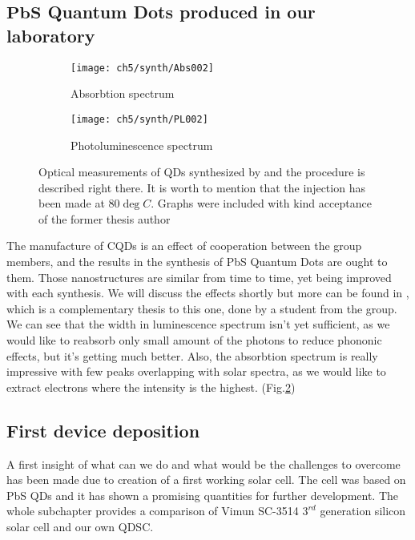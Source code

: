 \subsection{$\mathbf{PbS}$ Quantum Dots produced in our laboratory}

\begin{figure}
\centering
\begin{subfigure}[b]{0.7\textwidth}
\centering
\texttt{[image: ch5/synth/Abs002]}
\caption{Absorbtion spectrum}
\end{subfigure}

\hfill

\begin{subfigure}[b]{0.7\textwidth}
\centering
\texttt{[image: ch5/synth/PL002]}
\caption{Photoluminescence spectrum}
\label{fig:synth}
\end{subfigure}

\caption{Optical measurements of QDs synthesized by \cite{swietek} and the procedure is described right there. It is worth to mention that the injection has been made at 80$\deg C$. Graphs were included with kind acceptance of the former thesis author}
\end{figure}

The manufacture of CQDs is an effect of cooperation between the group members, and the results in the synthesis of PbS Quantum Dots are ought to them. Those nanostructures are similar from time to time, yet being improved with each synthesis. We will discuss the effects shortly but more can be found in \cite{swietek}, which is a complementary thesis to this one, done by a student from the group. We can see that the width in luminescence spectrum isn't yet sufficient, as we would like to reabsorb only small amount of the photons to reduce phononic effects, but it's getting much better. Also, the absorbtion spectrum is really impressive with few peaks overlapping with solar spectra, as we would like to extract electrons where the intensity is the highest. (Fig.\ref{fig:synth}) 


\subsection{First device deposition}

A first insight of what can we do and what would be the challenges to overcome has been made due to creation of a first working solar cell. The cell was based on PbS QDs and it has shown a promising quantities for further development. The whole subchapter provides a comparison of Vimun SC-3514 $3^{rd}$ generation silicon solar cell and our own QDSC.


